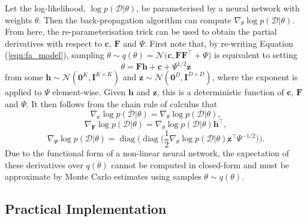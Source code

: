 \documentclass[msc,deptreport.inf]{infthesis} %
\newcommand{\matr}[1]{\mathbf{#1}}
\newcommand{\diag}{\mathop{\mathrm{diag}}}
\begin{document}
Let the log-likelihood, $\log p(\mathcal{D} | \theta)$, be parameterised by a neural network with weights $\theta$. Then the back-propagation algorithm \cite{rumelhart1986} can compute $\nabla_\theta \log p(\mathcal{D} | \theta)$. From here, the re-parameterisation trick \cite{goodfellow2016} can be used to obtain the partial derivatives with respect to $\matr{c}$, $\matr{F}$ and $\Psi$. First note that, by re-writing Equation (\ref{eqn:fa_model}), sampling $\theta \sim q(\theta) = \mathcal{N}\big(\matr{c}, \matr{FF}^{\intercal} + \Psi\big)$ is equivalent to setting  
\begin{equation}\label{eqn:fa_reparam_trick}
	\theta = \matr{Fh} + \matr{c} + \Psi^{1/2} \matr{z}
\end{equation}
from some $\matr{h} \sim \mathcal{N}(\matr{0}^K, \matr{I}^{K \times K})$ and $\matr{z} \sim \mathcal{N}(\matr{0}^D, \matr{I}^{D \times D})$, where the exponent is applied to $\Psi$ element-wise. Given $\matr{h}$ and $\matr{z}$, this is a deterministic function of $\matr{c}$, $\matr{F}$ and $\Psi$. It then follows from the chain rule of calculus that
\begin{equation}
	\nabla_{\matr{c}} \log p(\mathcal{D} | \theta) = \nabla_\theta \log p(\mathcal{D} | \theta),
\end{equation}
\begin{equation}
	\nabla_{\matr{F}} \log p(\mathcal{D} | \theta) = \nabla_\theta \log p(\mathcal{D} | \theta) \matr{h}^\intercal,
\end{equation}
\begin{equation}\label{eqn:grad_likelihood_wrt_psi}
	\nabla_{\Psi} \log p(\mathcal{D} | \theta) =  \diag\Big(\diag\Big(\frac{1}{2} \nabla_\theta \log p(\mathcal{D} | \theta) \matr{z}^\intercal \Psi^{-1/2}\Big)\Big).
\end{equation}
Due to the functional form of a non-linear neural network, the expectation of these derivatives over $q(\theta)$ cannot be computed in closed-form and must be approximate by Monte Carlo estimates using samples $\theta \sim q(\theta)$. 


\subsection{Practical Implementation}
\end{document}

